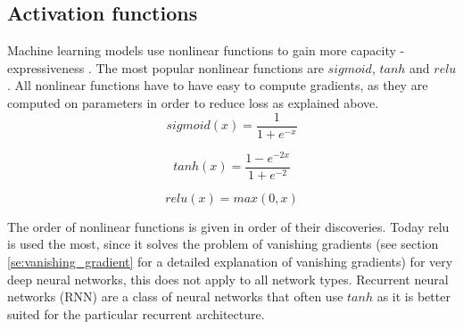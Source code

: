\documentclass[times, utf8, diplomski]{fer}
\begin{document}
\subsection{Activation functions} \label{se:activation_functions}
Machine learning models use nonlinear functions to gain more capacity - expressiveness
. The most popular nonlinear functions are $sigmoid$, $tanh$ and $relu$. All nonlinear functions have to have easy to compute gradients, as they are computed on parameters in order to reduce loss as explained above. 
\begin{equation} \label{eq:sigmoid}
	sigmoid(x) = \frac{1}{1 + e^{-x}}
\end{equation}

\begin{equation} \label{eq:tanh}
	tanh(x) = \frac{1 - e^{-2x}}{1 + e^{-2}}
\end{equation}

\begin{equation} \label{eq:relu}
	relu(x) = max(0, x)
\end{equation}

The order of nonlinear functions is given in order of their discoveries. Today relu is used the most, since it solves the problem of vanishing gradients (see section \ref{se:vanishing_gradient} for a detailed explanation of vanishing gradients) for very deep neural networks, this does not apply to all network types. Recurrent neural networks (RNN) are a class of neural networks that often use $tanh$ as it is better suited for the particular recurrent architecture.
\end{document}

